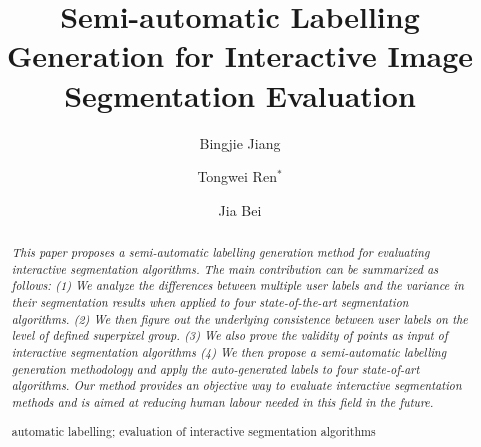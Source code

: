 \documentclass[runningheads,a4paper]{llncs}
\newcommand{\keywords}[1]{\par\addvspace\baselineskip
\noindent\keywordname\enspace\ignorespaces#1}
\begin{document}
\mainmatter  %

\title{Semi-automatic Labelling Generation for Interactive Image Segmentation Evaluation}


%
%
\author{Bingjie Jiang \and Tongwei Ren$^{*}$ \and Jia Bei}
%


\maketitle


\begin{abstract}
\emph{This paper proposes a semi-automatic labelling generation method for evaluating interactive segmentation algorithms. The main contribution can be summarized as follows: (1) We analyze the differences between multiple user labels and the variance in their segmentation results when applied to four state-of-the-art segmentation algorithms. (2) We then figure out the underlying consistence between user labels on the level of defined superpixel group. (3) We also prove the validity of points as input of interactive segmentation algorithms (4) We then propose a semi-automatic labelling generation methodology and apply the auto-generated labels to four state-of-art algorithms. Our method provides an objective way to evaluate interactive segmentation methods and is aimed at reducing human labour needed in this field in the future.
} 

\keywords{automatic labelling; evaluation of interactive segmentation algorithms}
\end{abstract}
\end{document}

